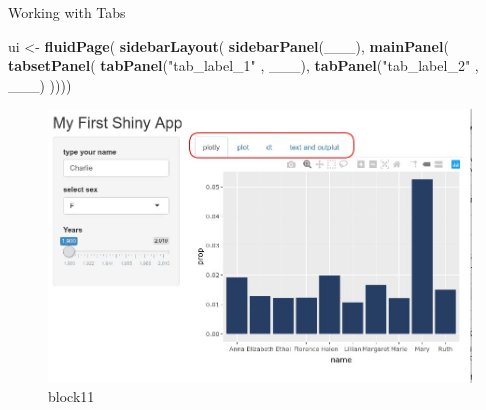 \documentclass[
  ignorenonframetext,
]{beamer}
\newenvironment{Shaded}{\begin{snugshade}}{\end{snugshade}}
\newcommand{\KeywordTok}[1]{\textcolor[rgb]{0.13,0.29,0.53}{\textbf{#1}}}
\newcommand{\NormalTok}[1]{#1}
\newcommand{\StringTok}[1]{\textcolor[rgb]{0.31,0.60,0.02}{#1}}
\begin{document}
\begin{frame}[fragile]{Working with Tabs}
\protect\hypertarget{working-with-tabs}{}

\begin{Shaded}
\begin{Highlighting}[]
\NormalTok{  ui <{-}}\StringTok{ }\KeywordTok{fluidPage}\NormalTok{(}
  \KeywordTok{sidebarLayout}\NormalTok{(}
    \KeywordTok{sidebarPanel}\NormalTok{(\_\_\_),}
    \KeywordTok{mainPanel}\NormalTok{(}
      \KeywordTok{tabsetPanel}\NormalTok{(}
        \KeywordTok{tabPanel}\NormalTok{(}\StringTok{"tab\_label\_1"}\NormalTok{ , \_\_\_),}
        \KeywordTok{tabPanel}\NormalTok{(}\StringTok{"tab\_label\_2"}\NormalTok{ , \_\_\_)}
\NormalTok{      ))))}
\end{Highlighting}
\end{Shaded}

\begin{figure}
\centering
\includegraphics{images/tabs.jpg}
\caption{block11}
\end{figure}

\end{frame}
\end{document}
